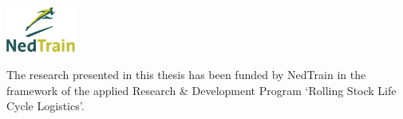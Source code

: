 \begin{titlepage}
%
%
%


\vfill

\vspace{1.0cm}
\begin{minipage}[t]{0.25\textwidth}
\includegraphics[height=0.6in]{title/logos/nedtrain.pdf}
\end{minipage}
%
\begin{minipage}[b]{0.7\textwidth}
The research presented in this thesis has been funded by NedTrain in the framework of the applied Research \& Development Program `Rolling Stock Life Cycle Logistics'.
\end{minipage}
\vspace{1.0cm}


\end{titlepage}
